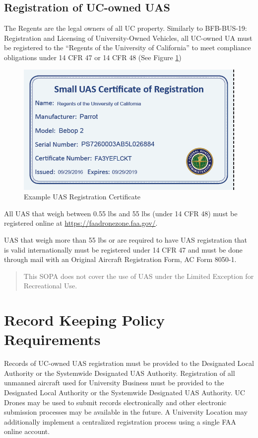 \documentclass[
]{book}
\begin{document}
\hypertarget{registration-of-uc-owned-uas}{%
\subsection{Registration of UC-owned UAS}\label{registration-of-uc-owned-uas}}

The Regents are the legal owners of all UC property. Similarly to BFB-BUS-19: Registration and Licensing of University-Owned Vehicles, all UC-owned UA must be registered to the ``Regents of the University of California'' to meet compliance obligations under 14 CFR 47 or 14 CFR 48 (See Figure \ref{fig:reg-cert})

\begin{figure}

{\centering \includegraphics[width=0.5\linewidth]{images/reg_cert} 

}

\caption{Example UAS Registration Certificate}\label{fig:reg-cert}
\end{figure}

All UAS that weigh between 0.55 lbs and 55 lbs (under 14 CFR 48) must be registered online at \url{https://faadronezone.faa.gov/}.

UAS that weigh more than 55 lbs or are required to have UAS registration that is valid internationally must be registered under 14 CFR 47 and must be done through mail with an Original Aircraft Registration Form, AC Form 8050-1.

\begin{quote}
This SOPA does not cover the use of UAS under the Limited Exception for Recreational Use.
\end{quote}

\hypertarget{record-keeping-policy-requirements}{%
\section{Record Keeping Policy Requirements}\label{record-keeping-policy-requirements}}

Records of UC-owned UAS registration must be provided to the Designated Local Authority or the Systemwide Designated UAS Authority. Registration of all unmanned aircraft used for University Business must be provided to the Designated Local Authority or the Systemwide Designated UAS Authority. UC Drones may be used to submit records electronically and other electronic submission processes may be available in the future. A University Location may additionally implement a centralized registration process using a single FAA online account.
\end{document}
